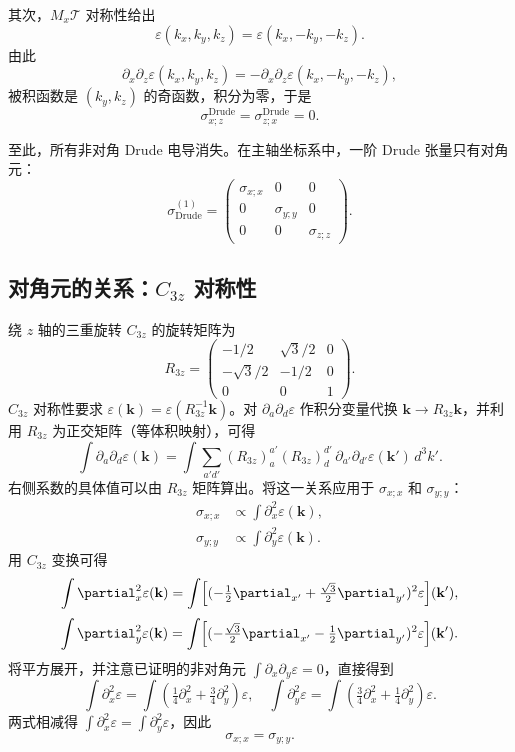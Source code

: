 其次，\(M_x\mathcal{T}\) 对称性给出
\[
\varepsilon(k_x,k_y,k_z) = \varepsilon(k_x,-k_y,-k_z).
\]
由此
\[
\partial_x\partial_z\varepsilon(k_x,k_y,k_z) = -\partial_x\partial_z\varepsilon(k_x,-k_y,-k_z),
\]
被积函数是 \((k_y,k_z)\) 的奇函数，积分为零，于是
\[
\sigma_{x;z}^{\mathrm{Drude}} = \sigma_{z;x}^{\mathrm{Drude}} = 0.
\]

至此，所有非对角 Drude 电导消失。在主轴坐标系中，一阶 Drude 张量只有对角元：
\[
\sigma^{(1)}_{\mathrm{Drude}} = \begin{pmatrix}
\sigma_{x;x} & 0 & 0 \\
0 & \sigma_{y;y} & 0 \\
0 & 0 & \sigma_{z;z}
\end{pmatrix}.
\]

\subsection{对角元的关系：\(C_{3z}\) 对称性}
绕 \(z\) 轴的三重旋转 \(C_{3z}\) 的旋转矩阵为
\[
R_{3z} = \begin{pmatrix}
-1/2 & \sqrt{3}/2 & 0 \\
-\sqrt{3}/2 & -1/2 & 0 \\
0 & 0 & 1
\end{pmatrix}.
\]
\(C_{3z}\) 对称性要求 \(\varepsilon(\mathbf{k}) = \varepsilon(R_{3z}^{-1}\mathbf{k})\)。对 \(\partial_a\partial_d\varepsilon\) 作积分变量代换 \(\mathbf{k} \to R_{3z}\mathbf{k}\)，并利用 \(R_{3z}\) 为正交矩阵（等体积映射），可得
\[
\int \partial_a\partial_d\varepsilon(\mathbf{k}) = \int \sum_{a'd'} (R_{3z})_a^{a'} (R_{3z})_d^{d'} \,\partial_{a'}\partial_{d'}\varepsilon(\mathbf{k}') \, d^3k'.
\]
右侧系数的具体值可以由 \(R_{3z}\) 矩阵算出。将这一关系应用于 \(\sigma_{x;x}\) 和 \(\sigma_{y;y}\)：
\[
\begin{aligned}
\sigma_{x;x} &\propto \int \partial_x^2\varepsilon(\mathbf{k}), \\
\sigma_{y;y} &\propto \int \partial_y^2\varepsilon(\mathbf{k}) .
\end{aligned}
\]
用 \(C_{3z}\) 变换可得
\[
\int \partial_x^2\varepsilon(\mathbf{k}) = \int \Bigl[(-\tfrac12\partial_{x'} + \tfrac{\sqrt3}{2}\partial_{y'})^2 \varepsilon\Bigr](\mathbf{k}'),
\]
\[
\int \partial_y^2\varepsilon(\mathbf{k}) = \int \Bigl[(-\tfrac{\sqrt3}{2}\partial_{x'} - \tfrac12\partial_{y'})^2 \varepsilon\Bigr](\mathbf{k}').
\]
将平方展开，并注意已证明的非对角元 \(\int \partial_x\partial_y\varepsilon = 0\)，直接得到
\[
\int \partial_x^2\varepsilon = \int (\tfrac14 \partial_x^2 + \tfrac34 \partial_y^2)\varepsilon,
\quad
\int \partial_y^2\varepsilon = \int (\tfrac34 \partial_x^2 + \tfrac14 \partial_y^2)\varepsilon .
\]
两式相减得 \(\int \partial_x^2\varepsilon = \int \partial_y^2\varepsilon\)，因此
\[
{\sigma_{x;x} = \sigma_{y;y}} .
\]

